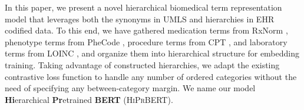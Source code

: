 \documentclass[12pt,a4paper]{cibb}
\begin{document}
In this paper, we present a novel hierarchical biomedical term representation model that leverages both the synonyms in UMLS and hierarchies in EHR codified data.  To this end, we have gathered medication terms from RxNorm \cite{Nelson2011NormalizedNF}, phenotype terms from PheCode \cite{Wu2019MappingIA}, procedure terms from CPT \cite{Dotson2013CPTCW}, and laboratory terms from LOINC \cite{McDonald2003LOINCAU}, and organize them into hierarchical structure for embedding training.  Taking advantage of constructed hierarchies, we adapt the existing contrastive loss function to handle any number of ordered categories without the need of specifying any between-category margin. We name our model \textbf{Hi}erarchical \textbf{Pr}etrained \textbf{BERT} (\textsc{HiPrBERT}).
\end{document}
